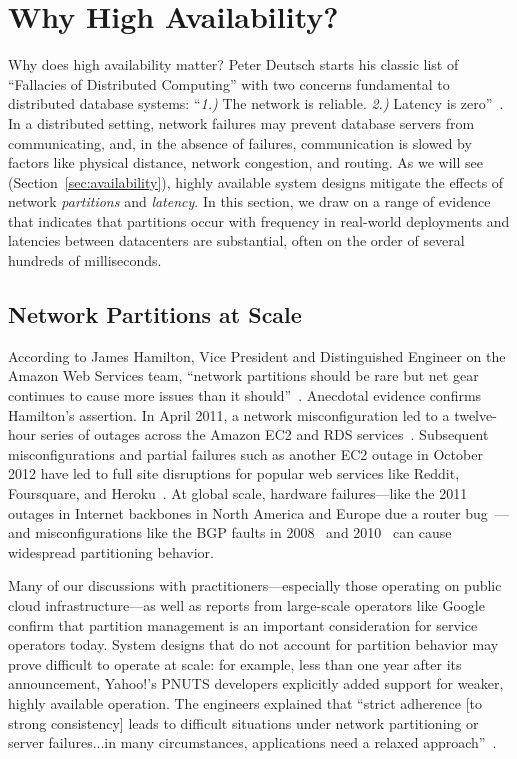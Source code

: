 
\section{Why High Availability?}
\label{sec:motivation}

Why does high availability matter? Peter Deutsch starts his classic
list of ``Fallacies of Distributed Computing'' with two concerns
fundamental to distributed database systems: ``\textit{1.)}  The
network is reliable. \textit{2.)} Latency is
zero''~\cite{fallacies-deutsch}. In a distributed setting, network
failures may prevent database servers from communicating, and, in the
absence of failures, communication is slowed by factors like physical
distance, network congestion, and routing. As we will see
(Section~\ref{sec:availability}), highly available system designs
mitigate the effects of network \textit{partitions} and
\textit{latency}. In this section, we draw on a range of evidence that
indicates that partitions occur with frequency in real-world
deployments and latencies between datacenters are substantial, often
on the order of several hundreds of milliseconds.

\subsection{Network Partitions at Scale}

According to James Hamilton, Vice President and Distinguished Engineer
on the Amazon Web Services team, ``network partitions should be rare
but net gear continues to cause more issues than it
should''~\cite{hamilton-partitions}. Anecdotal evidence confirms
Hamilton's assertion. In April 2011, a network misconfiguration led to
a twelve-hour series of outages across the Amazon EC2 and RDS
services~\cite{amazon-netpartition}. Subsequent misconfigurations and
partial failures such as another EC2 outage in October 2012 have led
to full site disruptions for popular web services like Reddit,
Foursquare, and Heroku~\cite{ec2-downsites}. At global scale, hardware
failures---like the 2011 outages in Internet backbones in North
America and Europe due a router bug~\cite{juniper-partition}---and
misconfigurations like the BGP faults in 2008~\cite{pakistan-youtube}
and 2010~\cite{research-experiment-partition} can cause widespread
partitioning behavior.

Many of our discussions with practitioners---especially those
operating on public cloud infrastructure---as well as reports from
large-scale operators like Google~\cite{dean-keynote} confirm that
partition management is an important consideration for service
operators today. System designs that do not account for partition
behavior may prove difficult to operate at scale: for example, less
than one year after its announcement, Yahoo!'s PNUTS developers
explicitly added support for weaker, highly available operation. The
engineers explained that ``strict adherence [to strong consistency]
leads to difficult situations under network partitioning or server
failures...in many circumstances, applications need a relaxed
approach''~\cite{pnuts-update}.

